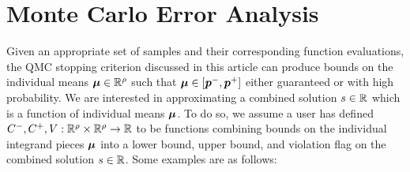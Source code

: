 \documentclass{article}[12pt]
\begin{document}
\section{Monte Carlo Error Analysis}

Given an appropriate set of  samples and their corresponding function evaluations, the QMC stopping criterion discussed in this article can produce bounds on the individual means $\boldsymbol{\mu} \in \mathbb{R}^\rho$ such that $\boldsymbol{\mu} \in [\boldsymbol{p}^-,\boldsymbol{p}^+]$ either guaranteed or with high probability. We are interested in approximating a combined solution $s \in \mathbb{R}$ which is a function of individual means $\boldsymbol{\mu}$. To do so, we assume a user has defined $C^-,C^+,V: \mathbb{R}^\rho \times \mathbb{R}^\rho \to \mathbb{R}$ to be functions combining bounds on the individual integrand pieces $\boldsymbol{\mu}$ into a lower bound, upper bound, and violation flag on the combined solution $s \in \mathbb{R}$. Some examples are as follows: 
\end{document}
